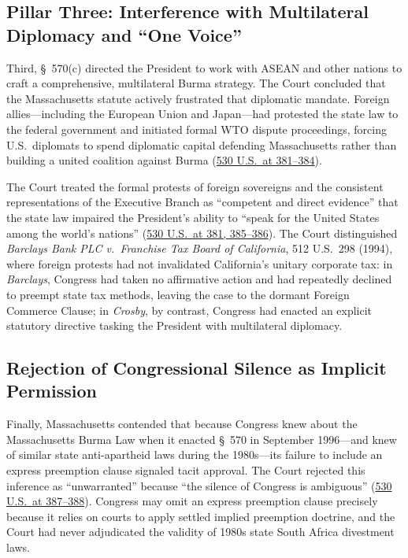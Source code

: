\documentclass[12pt]{article}
\begin{document}
\subsection{Pillar Three: Interference with Multilateral Diplomacy and ``One Voice''}
Third, \S~570(c) directed the President to work with ASEAN and other nations to craft a comprehensive, multilateral Burma strategy. The Court concluded that the Massachusetts statute actively frustrated that diplomatic mandate. Foreign allies---including the European Union and Japan---had protested the state law to the federal government and initiated formal WTO dispute proceedings, forcing U.S.\ diplomats to spend diplomatic capital defending Massachusetts rather than building a united coalition against Burma (\href{https://www.law.cornell.edu/supct/html/99-474.ZS.html}{530 U.S.\ at 381--384}).

The Court treated the formal protests of foreign sovereigns and the consistent representations of the Executive Branch as ``competent and direct evidence'' that the state law impaired the President's ability to ``speak for the United States among the world's nations'' (\href{https://www.law.cornell.edu/supct/html/99-474.ZS.html}{530 U.S.\ at 381, 385--386}). The Court distinguished \textit{Barclays Bank PLC v.\ Franchise Tax Board of California}, 512 U.S.\ 298 (1994), where foreign protests had not invalidated California's unitary corporate tax: in \textit{Barclays}, Congress had taken no affirmative action and had repeatedly declined to preempt state tax methods, leaving the case to the dormant Foreign Commerce Clause; in \textit{Crosby}, by contrast, Congress had enacted an explicit statutory directive tasking the President with multilateral diplomacy.

\subsection{Rejection of Congressional Silence as Implicit Permission}
Finally, Massachusetts contended that because Congress knew about the Massachusetts Burma Law when it enacted \S~570 in September 1996---and knew of similar state anti-apartheid laws during the 1980s---its failure to include an express preemption clause signaled tacit approval. The Court rejected this inference as ``unwarranted'' because ``the silence of Congress is ambiguous'' (\href{https://www.law.cornell.edu/supct/html/99-474.ZO.html}{530 U.S.\ at 387--388}). Congress may omit an express preemption clause precisely because it relies on courts to apply settled implied preemption doctrine, and the Court had never adjudicated the validity of 1980s state South Africa divestment laws.
\end{document}
